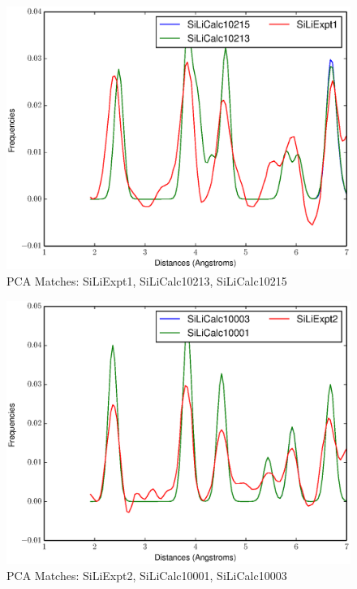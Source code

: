 \documentclass[12pt,letterpaper]{article}
\begin{document}
\begin{figure}[ht]
  \begin{center}
    \includegraphics[scale=0.8]{figs/PC10MatchSiLiExpt1-SiLiCalc10213-SiLiCalc10215.eps}
    \caption{PCA Matches: SiLiExpt1, SiLiCalc10213, SiLiCalc10215}
  \end{center}
\end{figure}

\begin{figure}[ht]
  \begin{center}
    \includegraphics[scale=0.8]{figs/PC10MatchSiLiExpt2-SiLiCalc10001-SiLiCalc10003.eps}
    \caption{PCA Matches: SiLiExpt2, SiLiCalc10001, SiLiCalc10003}
  \end{center}
\end{figure}
\end{document}
